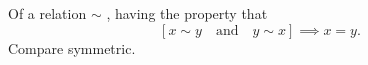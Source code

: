 Of a relation  $ \sim $ , having the property that
 \[ [ x \sim y \quad  \text{and} \quad  y \sim x ] \implies x=y. \] Compare symmetric.